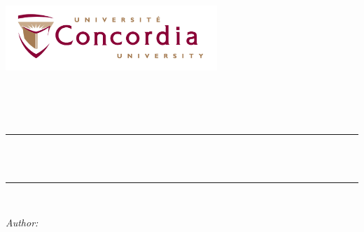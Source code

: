 \begin{titlepage}

    \newcommand{\HRule}{\rule{\linewidth}{0.5mm}} %
    
    \centering
    \includegraphics[width=8cm]{title/concordia.jpeg}\\[1cm] %
     
    
    \center %
    
    
    \textsc{\LARGE \assignname}\\[1.5cm] %
    \textsc{\Large \coursecode}\\[0.5cm] %
    \textsc{\large \coursetitle}\\[0.5cm]  %
    
    \makeatletter
    \HRule \\[0.4cm]
    { \huge \bfseries \@title}\\[0.4cm] %
    \HRule \\[1.5cm]
     
    
    \begin{minipage}{0.4\textwidth}
    \begin{flushleft} \large
    \emph{Author:}\\
    \@author %
    

\end{flushleft}
\end{minipage}
\end{titlepage}
